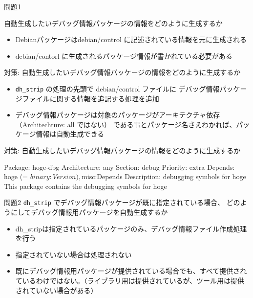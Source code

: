 \begin{frame}{問題1}

自動生成したいデバッグ情報パッケージの情報をどのように生成するか
\pause
\begin{itemize}
\item Debianパッケージはdebian/control に記述されている情報を元に生成される
\item debian/contorl に生成されるパッケージ情報が書かれている必要がある
\end{itemize}
\end{frame}

\begin{frame}[containsverbatim]{対策: 自動生成したいデバッグ情報パッケージの情報をどのように生成するか}
\begin{itemize}
\item \texttt{dh\_strip} の処理の先頭で debian/control ファイルに
デバッグ情報パッケージファイルに関する情報を追記する処理を追加
\item デバッグ情報パッケージは対象のパッケージがアーキテクチャ依存（Architechture: all ではない）
である事とパッケージ名さえわかれば、パッケージ情報は自動生成できる
\end{itemize}
\end{frame}

\begin{frame}[containsverbatim]{対策: 自動生成したいデバッグ情報パッケージの情報をどのように生成するか}


\begin{commandline}
Package: hoge-dbg
Architecture: any
Section: debug
Priority: extra
Depends: hoge (= ${binary:Version}), ${misc:Depends}
Description: debugging symbols for hoge
 This package contains the debugging symbols for hoge
\end{commandline}

\end{frame}

\begin{frame}{問題2}
\texttt{dh\_strip} でデバッグ情報パッケージが既に指定されている場合、
どのようにしてデバッグ情報用パッケージを自動生成するか
\pause
\begin{itemize}
\item dh\_stripは指定されているパッケージのみ、デバッグ情報ファイル作成処理を行う
\item 指定されていない場合は処理されない
\item 既にデバッグ情報用パッケージが提供されている場合でも、すべて提供されているわけではない。（ライブラリ用は提供されているが、ツール用は提供されていない場合がある）
\end{itemize}
\end{frame}

